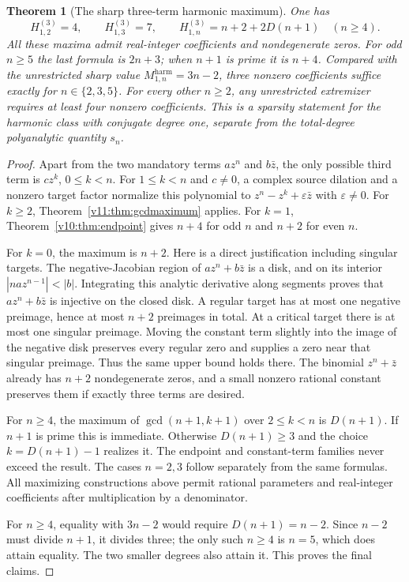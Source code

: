 \documentclass[UTF8,11pt]{ctexart}
\newtheorem{thm}{Theorem}[section]
\theoremstyle{definition}
\numberwithin{equation}{section}
\begin{document}
\begin{thm}[The sharp three-term harmonic maximum]
\label{v11:thm:sparsemaximum}
One has
\begin{equation}\label{v11:eq:sparsemaximum}
 H^{(3)}_{1,2}=4,\qquad H^{(3)}_{1,3}=7,\qquad
 H^{(3)}_{1,n}=n+2+2D(n+1)\quad(n\ge4).
\end{equation}
All these maxima admit real-integer coefficients and
nondegenerate zeros. For odd $n\ge5$ the last formula is
$2n+3$; when $n+1$ is prime it is $n+4$.
Compared with the unrestricted sharp value
$M^{\mathrm{harm}}_{1,n}=3n-2$, three nonzero coefficients
suffice exactly for $n\in\{2,3,5\}$.
For every other $n\ge2$, any unrestricted extremizer requires
at least four nonzero coefficients. This is a sparsity statement
for the harmonic class with conjugate degree one, separate from
the total-degree polyanalytic quantity $s_n$.
\end{thm}
\begin{proof}
Apart from the two mandatory terms $az^n$ and $b\bar z$,
the only possible third term is $cz^k$, $0\le k<n$.
For $1\le k<n$ and $c\ne0$, a complex source dilation and
a nonzero target factor normalize this polynomial to
$z^n-z^k+\varepsilon\bar z$ with $\varepsilon\ne0$.
For $k\ge2$, Theorem~\ref{v11:thm:gcdmaximum} applies.
For $k=1$, Theorem~\ref{v10:thm:endpoint} gives $n+4$ for
odd $n$ and $n+2$ for even $n$.

For $k=0$, the maximum is $n+2$. Here is a direct justification
including singular targets. The negative-Jacobian region of
$az^n+b\bar z$ is a disk, and on its interior
$|naz^{n-1}|<|b|$. Integrating this analytic derivative along
segments proves that $az^n+b\bar z$ is injective on the closed
disk. A regular target has at most one negative preimage, hence
at most $n+2$ preimages in total. At a critical target there is
at most one singular preimage. Moving the constant term slightly
into the image of the negative disk preserves every regular zero
and supplies a zero near that singular preimage. Thus the same
upper bound holds there. The binomial $z^n+\bar z$ already has
$n+2$ nondegenerate zeros, and a small nonzero rational constant
preserves them if exactly three terms are desired.

For $n\ge4$, the maximum of $\gcd(n+1,k+1)$ over
$2\le k<n$ is $D(n+1)$. If $n+1$ is prime this is immediate.
Otherwise $D(n+1)\ge3$ and the choice $k=D(n+1)-1$ realizes it.
The endpoint and constant-term families never exceed the result.
The cases $n=2,3$ follow separately from the same formulas.
All maximizing constructions above permit rational parameters
and real-integer coefficients after multiplication by a denominator.

For $n\ge4$, equality with $3n-2$ would require
$D(n+1)=n-2$. Since $n-2$ must divide $n+1$, it divides three;
the only such $n\ge4$ is $n=5$, which does attain equality.
The two smaller degrees also attain it. This proves the final claims.
\end{proof}
\end{document}
